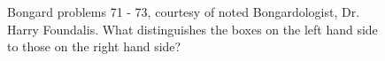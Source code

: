 \begin{figure}[h!]
  \centering




  \caption{Bongard problems 71 - 73, courtesy of noted Bongardologist, Dr. Harry Foundalis.  What distinguishes the boxes on the left hand side to those on the right hand side?}
  \label{fig:bongard-problems-71}
\end{figure}


